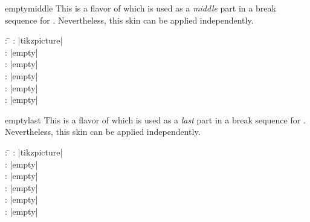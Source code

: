 \begin{dispExample}
\end{dispExample}


\clearpage

\begin{docSkin}{emptymiddle}
This is a flavor of  which is used as a \emph{middle} part
in a break sequence for .
Nevertheless, this skin can be applied independently.
\begin{tcolorbox}[skintable=emptymiddle]
  \begin{tabbing}
    : \=\kill
    :  \> |tikzpicture|\\ 
    :           \> |empty|\\
    : \> |empty|\\ 
    :        \> |empty|\\
    :    \> |empty|\\
    :           \> |empty|
  \end{tabbing}
\end{tcolorbox}
\end{docSkin}


\begin{dispExample}
\end{dispExample}


\clearpage
\begin{docSkin}{emptylast}
This is a flavor of  which is used as a \emph{last} part
in a break sequence for .
Nevertheless, this skin can be applied independently.
\begin{tcolorbox}[skintable=emptylast]
  \begin{tabbing}
    : \=\kill
    :  \> |tikzpicture|\\ 
    :           \> |empty|\\
    : \> |empty|\\ 
    :        \> |empty|\\
    :    \> |empty|\\
    :           \> |empty|
  \end{tabbing}
\end{tcolorbox}
\end{docSkin}

